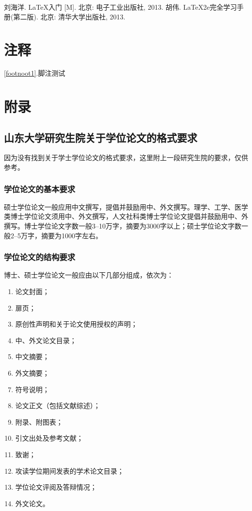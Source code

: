\documentclass[openany]{sduthesis} %
\begin{document}
\begin{thebibliography}{1}
 刘海洋. \LaTeX 入门 [M]. 北京: 电子工业出版社, 2013.
  胡伟. \LaTeX 2e完全学习手册(第二版). 北京: 清华大学出版社, 2013.
\end{thebibliography}

 


\chapter*{注{\quad}{\quad}{\quad}释}
\ref{footnoot1}.脚注测试

\chapter*{ 附{\quad}{\quad}{\quad}录}

\section{山东大学研究生院关于学位论文的格式要求}
因为没有找到关于学士学位论文的格式要求，这里附上一段研究生院的要求，仅供参考。
\subsection{学位论文的基本要求}
硕士学位论文一般应用中文撰写，提倡并鼓励用中、外文撰写。理学、工学、医学类博士学位论文须用中、外文撰写，人文社科类博士学位论文提倡并鼓励用中、外撰写。博士学位论文字数一般3--10万字，摘要为3000字以上；硕士学位论文字数一般2--5万字，摘要为1000字左右。
\subsection{学位论文的结构要求}
博士、硕士学位论文一般应由以下几部分组成，依次为：
\begin{enumerate}
\item 论文封面；\item 扉页；\item 原创性声明和关于论文使用授权的声明；\item 中、外文论文目录；\item 中文摘要；\item 外文摘要；\item 符号说明；\item 论文正文（包括文献综述）；\item 附录、附图表；\item 引文出处及参考文献；\item 致谢；\item 攻读学位期间发表的学术论文目录；\item 学位论文评阅及答辩情况；\item 外文论文。
\end{enumerate}
\end{document}
